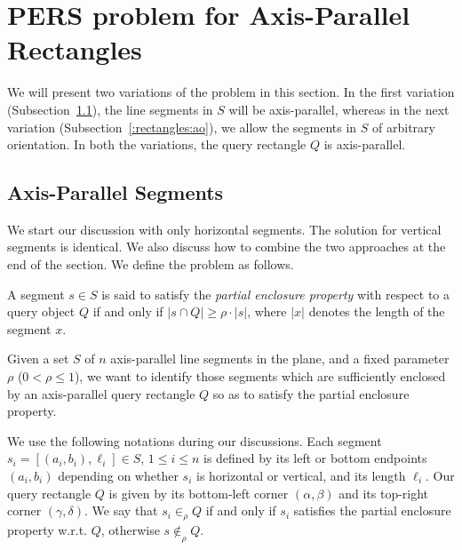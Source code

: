 \section{PERS problem for Axis-Parallel Rectangles}
\label{:rectangles}


We will present two variations of the \PERS{} problem in this section. 
In the first variation (Subsection~\ref{:rectangles:ap}), the line 
segments in $S$ will  be axis-parallel, whereas in the next variation 
(Subsection~\ref{:rectangles:ao}), we allow the segments in $S$ of 
arbitrary orientation. In both the variations, the query rectangle $Q$ 
is axis-parallel. 

\subsection{Axis-Parallel Segments}
\label{:rectangles:ap}

We start our discussion with only horizontal segments. The solution 
for vertical segments is identical. We also discuss how to combine 
the two approaches at the end of the section. We define the problem 
as follows.

\begin{definition}
A segment $s \in S$ is said to satisfy the {\em partial enclosure 
property} with respect to a query object $Q$ if and only if 
$|s \cap Q| \geq \rho \cdot |s|$, where $|x|$ denotes the length 
of the segment $x$.
\end{definition}

\begin{problem}
Given a set $S$ of $n$ axis-parallel line segments in the plane, 
and a fixed parameter $\rho$ ($0 < \rho \leq 1$), we want to 
identify those segments which are sufficiently enclosed by 
an axis-parallel query rectangle $Q$ so as to satisfy the 
partial enclosure property. 
\end{problem}

We use the following notations during our discussions. Each segment 
$s_i =[(a_i,b_i), \ell_i] \in S$, $1 \leq i \leq n$ is defined 
by its left or bottom endpoints $(a_i, b_i)$ depending on whether 
$s_i$ is horizontal or vertical, and its length $\ell_i$. 
Our query rectangle $Q$ is given by its bottom-left corner $(\alpha, 
\beta)$ and its top-right corner $(\gamma, \delta)$.  We say that $s_i \in_\rho Q$ if and only 
if $s_i$ satisfies the partial enclosure property w.r.t. $Q$, 
otherwise $s \not \in_\rho Q$. 



